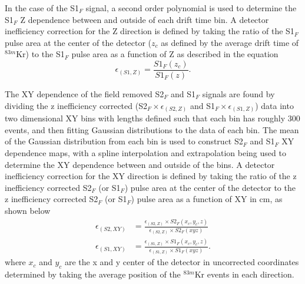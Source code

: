 In the case of the S1$_F$ signal, a second order polynomial is used to determine the S1$_F$ Z dependence between and outside of each drift time bin. A detector inefficiency correction for the Z direction is defined by taking the ratio of the S1$_F$  pulse area at the center of the detector ($z_c$ as defined by the average drift time of $^{83m}$Kr) to the S1$_F$ pulse area as a function of Z as described in the equation
\begin{equation}
\epsilon_{(S1,Z)} = \frac{S1_F(z_c)}{S1_F(z)}.
\end{equation} 


The XY dependence of the field removed S2$_F$ and S1$_F$ signals are found by dividing the z inefficiency corrected (S2$_F \times \epsilon_{(S2,Z)}$ and S1$_F \times \epsilon_{(S1,Z)}$) data into two dimensional XY bins with lengths defined such that each bin has roughly 300 events, and then fitting Gaussian distributions to the data of each bin.  The mean of the Gaussian distribution from each bin is used to construct S2$_F$ and S1$_F$ XY dependence maps, with a spline interpolation and extrapolation being used to determine the XY dependence between and outside of the bins.  A detector inefficiency correction for the XY direction is defined by taking the ratio of the z inefficiency corrected S2$_F$ (or S1$_F$) pulse area at the center of the detector to the z inefficiency corrected S2$_F$ (or S1$_F$) pulse area as a function of XY in cm, as shown below
\begin{align}
\epsilon_{(S2,XY)} &= \frac{\epsilon_{(S2,Z)} \times S2_F(x_c,y_c,z)}{\epsilon_{(S2,Z)} \times S2_F(xyz)} \\
\epsilon_{(S1,XY)} &= \frac{\epsilon_{(S1,Z)}\times S1_F(x_c,y_c,z)}{\epsilon_{(S1,Z)} \times S1_F(xyz)}.
\end{align} 
where $x_c$ and $y_c$ are the x and y center of the detector in uncorrected coordinates determined by taking the average position of the $^{83m}$Kr events in each direction.  


